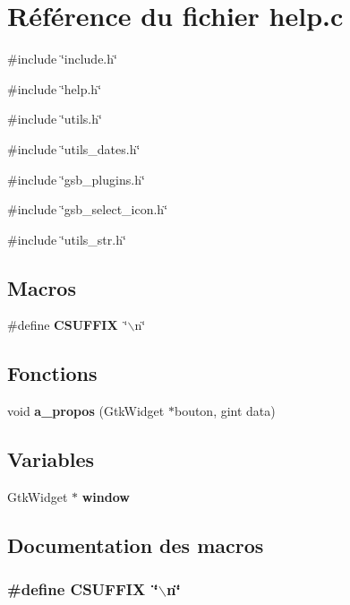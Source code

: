 \section{Référence du fichier help.c}
\label{help_8c}
{\ttfamily \#include \char`\"{}include.h\char`\"{}}\par
{\ttfamily \#include \char`\"{}help.h\char`\"{}}\par
{\ttfamily \#include \char`\"{}utils.h\char`\"{}}\par
{\ttfamily \#include \char`\"{}utils\_\-dates.h\char`\"{}}\par
{\ttfamily \#include \char`\"{}gsb\_\-plugins.h\char`\"{}}\par
{\ttfamily \#include \char`\"{}gsb\_\-select\_\-icon.h\char`\"{}}\par
{\ttfamily \#include \char`\"{}utils\_\-str.h\char`\"{}}\par
\subsection*{Macros}
\begin{DoxyCompactItemize}
\item 
\#define {\bf CSUFFIX}~\char`\"{}$\backslash$n\char`\"{}
\end{DoxyCompactItemize}
\subsection*{Fonctions}
\begin{DoxyCompactItemize}
\item 
void {\bf a\_\-propos} (GtkWidget $\ast$bouton, gint data)
\end{DoxyCompactItemize}
\subsection*{Variables}
\begin{DoxyCompactItemize}
\item 
GtkWidget $\ast$ {\bf window}
\end{DoxyCompactItemize}


\subsection{Documentation des macros}
\subsubsection[{CSUFFIX}]{\setlength{\rightskip}{0pt plus 5cm}\#define CSUFFIX~\char`\"{}$\backslash$n\char`\"{}}\label{help_8c_a5dd017af06ba8860788cba37b28f5565}


